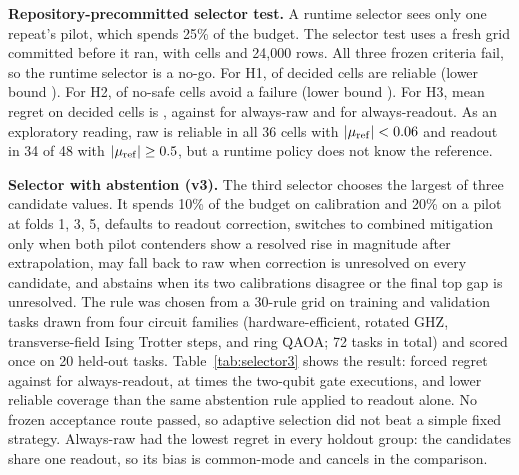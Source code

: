 \documentclass[10pt,twocolumn]{article}
\newcommand{\paragraphlead}[1]{\textbf{#1}\quad}
\begin{document}
\paragraphlead{Repository-precommitted selector test.}
A runtime selector sees only one repeat's pilot, which spends 25\% of the budget. The selector test
uses a fresh grid committed before it ran, with \VTwoCells{} cells and 24,000 rows. All three frozen
criteria fail, so the runtime selector is a no-go. For H1, \VTwoReliableCells{} of
\VTwoDecidedCells{} decided cells are reliable (lower bound \VTwoHOneLow{}). For H2,
\VTwoAvoidedCells{} of \VTwoNoSafeCells{} no-safe cells avoid a failure (lower bound
\VTwoHTwoLow{}). For H3, mean regret on decided cells is \VTwoRegretSelector{}, against
\VTwoRegretRaw{} for always-raw and \VTwoRegretReadout{} for always-readout. As an exploratory
reading, raw is reliable in all 36 cells with $|\mu_{\rm ref}|<0.06$ and readout in 34 of 48 with
$|\mu_{\rm ref}|\geq0.5$, but a runtime policy does not know the reference.

\paragraphlead{Selector with abstention (v3).}
The third selector chooses the largest of three candidate values. It spends 10\% of the budget on
calibration and 20\% on a pilot at folds 1, 3, 5, defaults to readout correction, switches to combined
mitigation only when both pilot contenders show a resolved rise in magnitude after extrapolation,
may fall back to raw when correction is unresolved on every candidate, and abstains when its two
calibrations disagree or the final top gap is unresolved. The rule was chosen from a 30-rule grid
on training and validation tasks drawn from four circuit families (hardware-efficient, rotated GHZ,
transverse-field Ising Trotter steps, and ring QAOA; 72 tasks in total) and scored once on 20
held-out tasks. Table~\ref{tab:selector3} shows the result: forced regret
\ThreeRegretSelector{} against \ReadoutThreeRegret{} for always-readout, at \ThreeCostRatioSelector{}
times the two-qubit gate executions, and lower reliable coverage than the same abstention rule
applied to readout alone. No frozen acceptance route passed, so adaptive selection did not beat a
simple fixed strategy. Always-raw had the lowest regret in every holdout group: the candidates share
one readout, so its bias is common-mode and cancels in the comparison.
\end{document}

